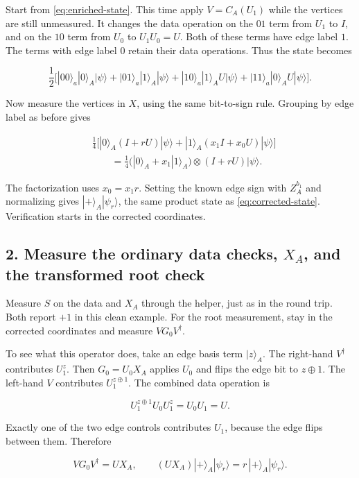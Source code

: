 \documentclass[11pt,a4paper]{article}
\begin{document}
Start from \eqref{eq:enriched-state}. This time apply \(V=C_A(U_1)\) while the vertices are still
unmeasured. It changes the data operation on the \(01\) term from \(U_1\)
to \(I\), and on the \(10\) term from \(U_0\) to \(U_1U_0=U\). Both of
these terms have edge label \(1\). The terms with edge label \(0\) retain
their data operations. Thus the state becomes

\[
\frac12\Big[
 |00\rangle_a|0\rangle_A|\psi\rangle
+|01\rangle_a|1\rangle_A|\psi\rangle
+|10\rangle_a|1\rangle_A U|\psi\rangle
+|11\rangle_a|0\rangle_A U|\psi\rangle
\Big].
\]

Now measure the vertices in \(X\), using the same bit-to-sign rule.
Grouping by edge label as before gives

\[
\begin{aligned}
&\frac14\Big[
 |0\rangle_A (I+rU)|\psi\rangle
+|1\rangle_A (x_1 I+x_0U)|\psi\rangle
\Big]\\
&\qquad=
\frac14\bigl(|0\rangle_A+x_1|1\rangle_A\bigr)
\otimes(I+rU)|\psi\rangle .
\end{aligned}
\]

The factorization uses \(x_0=x_1r\). Setting the known edge sign with
\(Z_A^{b_1}\) and normalizing gives \(|+\rangle_A|\psi_r\rangle\), the
same product state as \eqref{eq:corrected-state}. Verification starts in the corrected
coordinates.

\subsection*{2. Measure the ordinary data checks, \(X_A\), and the transformed root check}

Measure \(S\) on the data and \(X_A\) through the helper, just as in the
round trip. Both report \(+1\) in this clean example. For the root
measurement, stay in the corrected coordinates and measure
\(VG_0V^\dagger\).

To see what this operator does, take an edge basis term \(|z\rangle_A\).
The right-hand \(V^\dagger\) contributes \(U_1^z\). Then \(G_0=U_0X_A\)
applies \(U_0\) and flips the edge bit to \(z\oplus1\). The left-hand
\(V\) contributes \(U_1^{z\oplus1}\). The combined data operation is

\[
U_1^{z\oplus1}U_0U_1^z=U_0U_1=U.
\]

Exactly one of the two edge controls contributes \(U_1\), because the
edge flips between them. Therefore

\[
VG_0V^\dagger=UX_A,\qquad
(UX_A)|+\rangle_A|\psi_r\rangle=r\,|+\rangle_A|\psi_r\rangle.
\]
\end{document}
